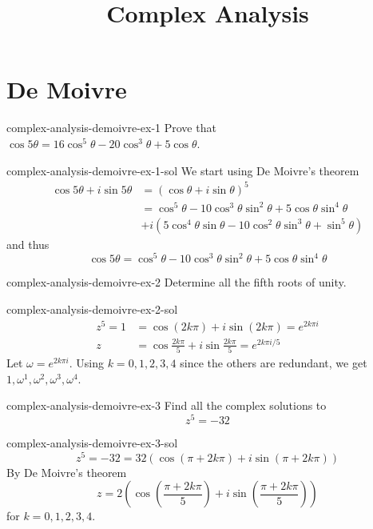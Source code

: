 \documentclass[preview]{standalone}
\begin{document}
\title{Complex Analysis}
\genpage

\section{De Moivre}

\begin{snippetexercise}{complex-analysis-demoivre-ex-1}{} %
    Prove that \(\cos5\theta = 16\cos^5\theta - 20\cos^3\theta+5\cos\theta\).
\end{snippetexercise}

\begin{snippetsolution}{complex-analysis-demoivre-ex-1-sol}{}
    We start using De Moivre's theorem
    \begin{align*}
        \cos5\theta + i\sin5\theta &= (\cos\theta + i\sin\theta)^5 \\
        &= \cos^5\theta - 10\cos^3\theta\sin^2\theta + 5\cos\theta\sin^4\theta \\
            &+ i(5\cos^4\theta\sin\theta -10\cos^2\theta\sin^3\theta + \sin^5\theta)
    \end{align*}
    and thus
    \[ \cos5\theta = \cos^5\theta - 10\cos^3\theta\sin^2\theta + 5\cos\theta\sin^4\theta \]
\end{snippetsolution}

\begin{snippetexercise}{complex-analysis-demoivre-ex-2}{} %
    Determine all the fifth roots of unity.
\end{snippetexercise}

\begin{snippetsolution}{complex-analysis-demoivre-ex-2-sol}{}
    \begin{align*}
        z^5 = 1 &= \cos (2k\pi) + i\sin(2k\pi) = e^{2k\pi i} \\
        z &= \cos \frac{2k\pi}{5} + i \sin \frac{2k\pi}{5} = e^{2k\pi i / 5}
    \end{align*}
    Let \(\omega = e^{2k\pi i}\). Using \(k=0,1,2,3,4\) since the others are redundant, we get
    \(1, \omega^1, \omega^2, \omega^3, \omega^4\).
\end{snippetsolution}

\begin{snippetexercise}{complex-analysis-demoivre-ex-3}{} %
    Find all the complex solutions to
    \[ z^5 = -32 \]
\end{snippetexercise}

\begin{snippetsolution}{complex-analysis-demoivre-ex-3-sol}{}
    \[  z^5 = -32 = 32\left( \cos(\pi + 2k\pi) + i\sin(\pi + 2k\pi) \right) \]
    By De Moivre's theorem
    \[
        z = 2\left( 
            \cos\left(\frac{\pi + 2k\pi}{5}\right) + i\sin\left(\frac{\pi + 2k\pi}{5}\right)
        \right)
    \]
    for \(k=0,1,2,3,4\).
\end{snippetsolution}
\end{document}
